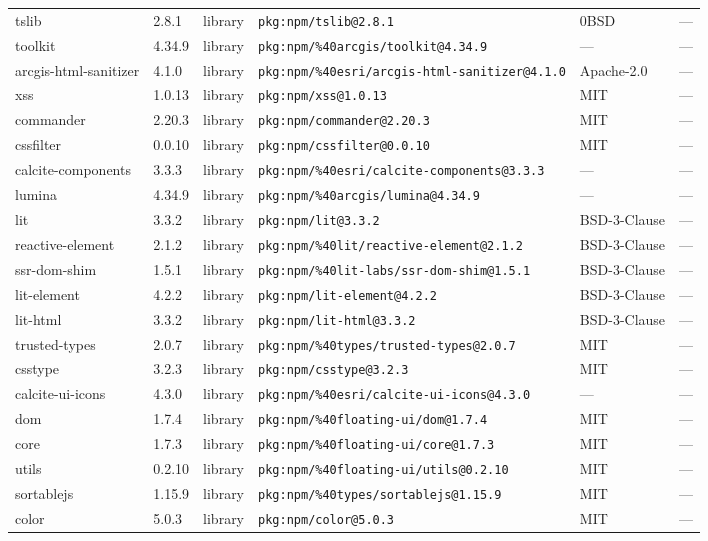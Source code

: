 \documentclass[11pt]{article}
\begin{document}
\begin{longtable}{|l|l|l|p{2.2cm}|l|p{4cm}|}
tslib & 2.8.1 & library & \texttt{pkg:npm/tslib@2.8.1} & 0BSD & — \\
toolkit & 4.34.9 & library & \texttt{pkg:npm/\%40arcgis/toolkit@4.34.9} & — & — \\
arcgis-html-sanitizer & 4.1.0 & library & \texttt{pkg:npm/\%40esri/arcgis-html-sanitizer@4.1.0} & Apache-2.0 & — \\
xss & 1.0.13 & library & \texttt{pkg:npm/xss@1.0.13} & MIT & — \\
commander & 2.20.3 & library & \texttt{pkg:npm/commander@2.20.3} & MIT & — \\
cssfilter & 0.0.10 & library & \texttt{pkg:npm/cssfilter@0.0.10} & MIT & — \\
calcite-components & 3.3.3 & library & \texttt{pkg:npm/\%40esri/calcite-components@3.3.3} & — & — \\
lumina & 4.34.9 & library & \texttt{pkg:npm/\%40arcgis/lumina@4.34.9} & — & — \\
lit & 3.3.2 & library & \texttt{pkg:npm/lit@3.3.2} & BSD-3-Clause & — \\
reactive-element & 2.1.2 & library & \texttt{pkg:npm/\%40lit/reactive-element@2.1.2} & BSD-3-Clause & — \\
ssr-dom-shim & 1.5.1 & library & \texttt{pkg:npm/\%40lit-labs/ssr-dom-shim@1.5.1} & BSD-3-Clause & — \\
lit-element & 4.2.2 & library & \texttt{pkg:npm/lit-element@4.2.2} & BSD-3-Clause & — \\
lit-html & 3.3.2 & library & \texttt{pkg:npm/lit-html@3.3.2} & BSD-3-Clause & — \\
trusted-types & 2.0.7 & library & \texttt{pkg:npm/\%40types/trusted-types@2.0.7} & MIT & — \\
csstype & 3.2.3 & library & \texttt{pkg:npm/csstype@3.2.3} & MIT & — \\
calcite-ui-icons & 4.3.0 & library & \texttt{pkg:npm/\%40esri/calcite-ui-icons@4.3.0} & — & — \\
dom & 1.7.4 & library & \texttt{pkg:npm/\%40floating-ui/dom@1.7.4} & MIT & — \\
core & 1.7.3 & library & \texttt{pkg:npm/\%40floating-ui/core@1.7.3} & MIT & — \\
utils & 0.2.10 & library & \texttt{pkg:npm/\%40floating-ui/utils@0.2.10} & MIT & — \\
sortablejs & 1.15.9 & library & \texttt{pkg:npm/\%40types/sortablejs@1.15.9} & MIT & — \\
color & 5.0.3 & library & \texttt{pkg:npm/color@5.0.3} & MIT & — \\

\end{longtable}
\end{document}
